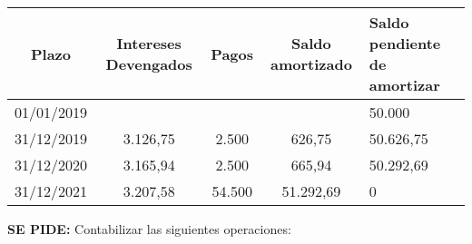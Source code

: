 \begin{table}[H]
\centering
\begin{tabular}{|c|c|c|c|p{4cm}|}
    \hline
    Plazo & Intereses Devengados & Pagos & Saldo amortizado & Saldo pendiente de amortizar \\
    \hline
    01/01/2019 & & & & 50.000 \\
    \hline
    31/12/2019 & 3.126,75 & 2.500 & 626,75 & 50.626,75 \\
    \hline
    31/12/2020 & 3.165,94 & 2.500 & 665,94 & 50.292,69 \\
    \hline
    31/12/2021 & 3.207,58 & 54.500 & 51.292,69 & 0 \\
    \hline
\end{tabular}
\end{table}

\textbf{SE PIDE:} Contabilizar las siguientes operaciones:

